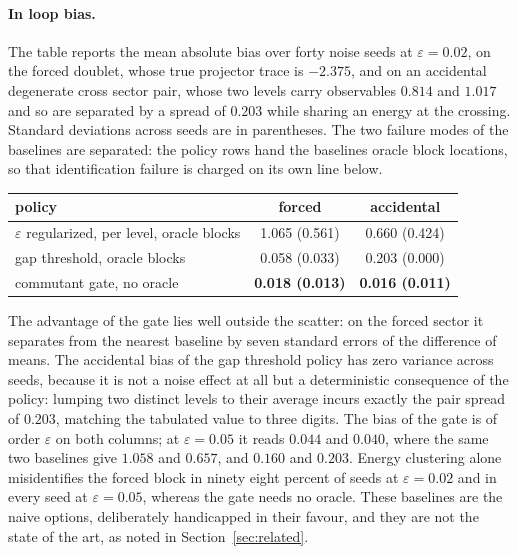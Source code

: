 \documentclass[10pt,a4paper]{amsart}
\begin{document}
\paragraph{In loop bias.}\label{sec:bias}
The table reports the mean absolute bias over forty noise seeds at
$\varepsilon=0.02$, on the forced doublet, whose true projector trace is
$-2.375$, and on an accidental degenerate cross sector pair, whose two levels
carry observables $0.814$ and $1.017$ and so are separated by a spread of $0.203$
while sharing an energy at the crossing. Standard deviations across seeds are in
parentheses. The two failure modes of the baselines are separated: the policy
rows hand the baselines oracle block locations, so that identification failure is
charged on its own line below.
\begin{center}
\begin{tabular}{lcc}
\toprule
policy & forced & accidental\\
\midrule
$\varepsilon$ regularized, per level, oracle blocks & 1.065 (0.561) & 0.660 (0.424)\\
gap threshold, oracle blocks & 0.058 (0.033) & 0.203 (0.000)\\
commutant gate, no oracle & \textbf{0.018 (0.013)} & \textbf{0.016 (0.011)}\\
\bottomrule
\end{tabular}
\end{center}
The advantage of the gate lies well outside the scatter: on the forced sector it
separates from the nearest baseline by seven standard errors of the difference of
means. The accidental bias of the gap threshold policy has zero variance across
seeds, because it is not a noise effect at all but a deterministic consequence of
the policy: lumping two distinct levels to their average incurs exactly the pair
spread of $0.203$, matching the tabulated value to three digits. The bias of the
gate is of order $\varepsilon$ on both columns; at $\varepsilon=0.05$ it reads
$0.044$ and $0.040$, where the same two baselines give $1.058$ and $0.657$, and
$0.160$ and $0.203$. Energy clustering alone misidentifies the forced block in
ninety eight percent of seeds at $\varepsilon=0.02$ and in every seed at
$\varepsilon=0.05$, whereas the gate needs no oracle. These baselines are the
naive options, deliberately handicapped in their favour, and they are not the
state of the art, as noted in Section~\ref{sec:related}.
\end{document}
